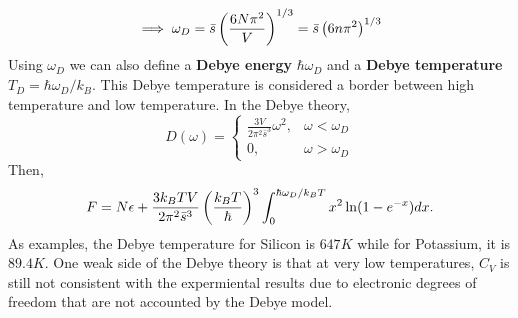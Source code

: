     \begin{equation}
        \implies \omega_D = \bar{s}\left( \frac{6N\pi^2}{V} \right)^{1/3}=\bar{s}\left( 6n\pi^2 \right)^{1/3}
    \end{equation}
    Using $\omega_D$ we can also define a \textbf{Debye energy} $\hbar\omega_D$ and a \textbf{Debye temperature} $T_D=\hbar\omega_D/k_B$. This Debye temperature is considered a border between high temperature and low temperature. In the Debye theory,
    \begin{equation}
        D(\omega)=\begin{cases}
            \frac{3V}{2\pi^2\bar{s}^3}\omega^2, & \omega<\omega_D \\
            0, & \omega>\omega_D
        \end{cases}
    \end{equation}
    Then,
    \begin{equation}
        F = N\epsilon + \frac{3k_BTV}{2\pi^2\bar{s}^3}\left( \frac{k_BT}{\hbar} \right)^3\int_{0}^{\hbar\omega_D/k_BT}x^2\ln(1-e^{-x})dx.
    \end{equation}
    As examples, the Debye temperature for Silicon is $647K$ while for Potassium, it is $89.4K$. One weak side of the Debye theory is that at very low temperatures, $C_V$ is still not consistent with the expermiental results due to electronic degrees of freedom that are not accounted by the Debye model. 
